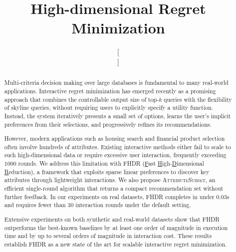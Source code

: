 \documentclass[conference]{IEEEtran}
\theoremstyle{definition}
\theoremstyle{plain}
\begin{document}
\title{High-dimensional Regret Minimization}

\author{
\and
{}
\and[\hfill\mbox{}\par\vspace{1em}\mbox{}\hfill]
\and
{}
}

\maketitle

\begin{abstract}

Multi-criteria decision making over large databases is fundamental to many real-world applications. Interactive regret minimization has emerged recently as a promising approach that combines the controllable output size of top-$k$ queries with the flexibility of skyline queries, without requiring users to explicitly specify a utility function. Instead, the system iteratively presents a small set of options, learns the user’s implicit preferences from their selections, and progressively refines its recommendations.

However, modern applications such as housing search and financial product selection often involve hundreds of attributes. Existing interactive methods either fail to scale to such high-dimensional data or require excessive user interaction, frequently exceeding $1000$ rounds. We address this limitation with \textsc{FHDR} (\underline{F}ast \underline{H}igh-\underline{D}imensional \underline{R}eduction), a framework that exploits sparse linear preferences to discover key attributes through lightweight interactions. We also propose \textsc{AttributeSubset}, an efficient single-round algorithm that returns a compact recommendation set without further feedback. In our experiments on real datasets, \textsc{FHDR} completes in under $0.03$s and requires fewer than $30$ interaction rounds under the default setting.

Extensive experiments on both synthetic and real-world datasets show that \textsc{FHDR} outperforms the best-known baselines by at least one order of magnitude in execution time and by up to several orders of magnitude in interaction cost. These results establish \textsc{FHDR} as a new state of the art for scalable interactive regret minimization.



\end{abstract}
\end{document}
